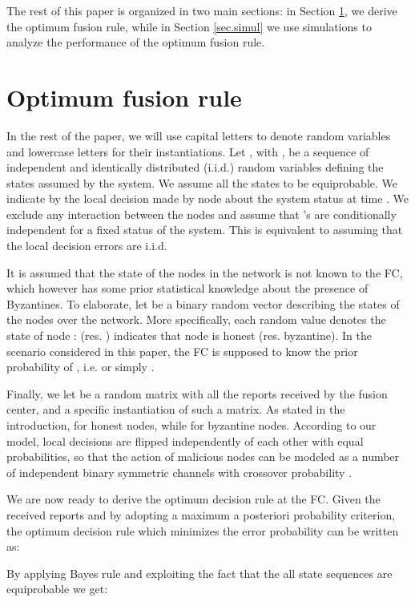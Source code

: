 \documentclass[10pt,peerreview,draftcls,onecolumn]{IEEEtran}
\begin{document}
The rest of this paper is organized in two main sections: in Section \ref{sec.PRstates}, we derive the optimum fusion rule, while in Section \ref{sec.simul} we use simulations to analyze the performance of the optimum fusion rule.
\section{Optimum fusion rule}
\label{sec.PRstates}

In the rest of the paper, we will use capital letters to denote random variables and lowercase letters for their instantiations.
Let , with , be a sequence of independent and identically distributed (i.i.d.) random variables defining the states assumed by the system. We assume all the states to be equiprobable.
We indicate by  the local decision made by node  about the system status at time . We exclude any interaction between the nodes and assume that 's are conditionally independent for a fixed status of the system. This is equivalent to assuming that the local decision errors are i.i.d.

It is assumed that the state of the nodes in the network is not known to the FC, which however has some prior statistical knowledge about the presence of Byzantines. To elaborate, let  be a binary random vector describing the states of the nodes over the network. More specifically, each random value  denotes the state of node :  (res. ) indicates that node  is honest (res. byzantine). In the scenario considered in this paper, the FC is supposed to know the prior probability  of , i.e.  or simply .

Finally, we let  be a random matrix with all the reports received by the fusion center, and  a specific instantiation of such a matrix. As stated in the introduction,  for honest nodes, while  for byzantine nodes. According to our model, local decisions  are flipped independently of each other with equal probabilities, so that the action of malicious nodes can be modeled as a number of independent binary symmetric channels with crossover probability .

We are now ready to derive the optimum decision rule at the FC. Given the received reports  and by adopting a maximum a posteriori probability criterion, the optimum decision rule which minimizes the error probability  can be written as:




By applying Bayes rule and exploiting the fact that the all state sequences are equiprobable we get:
\end{document}
